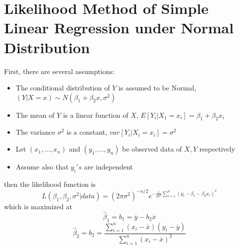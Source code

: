 \documentclass{article}
\begin{document}
\section{Likelihood Method of Simple Linear Regression under Normal Distribution}
First, there are several assumptions:
\begin{itemize}
    \item The conditional distribution of $Y$ is assumed to be Normal, $(Y|X=x)\sim N(\beta_1 + \beta_2x, \sigma^2)$
    \item The mean of $Y$ is a linear function of $X$, $E[Y_i|X_1=x_i] = \beta_1 + \beta_2 x_i$
    \item The variance $\sigma^2$ is a constant, $var[Y_i|X_i=x_i] = \sigma^2$
    \item Let $(x_1,...,x_n)$ and $(y_1,...,y_n)$ be observed data of $X,Y$ respectively
    \item Assume also that $y_i's$ are independent
\end{itemize}
then the likelihood function is
\begin{equation*}
    L(\beta_1,\beta_2,\sigma^2|data) = (2\pi \sigma^2)^{-n/2} e^{-\frac{1}{2\sigma^2}\sum_{i=1}^n(y_i - \beta_1 - \beta_2x_i)^2}
\end{equation*}
which is maximized at
\begin{equation*}
    \hat{\beta}_1 = b_1 = \overline{y} - b_2\overline{x}
\end{equation*}
\begin{equation*}
    \hat{\beta}_2 = b_2 = \frac{\sum_{i=1}^n(x_i - \overline{x})(y_i-\overline{y})}{\sum_{i=1}^n\left(x_i-\overline{x}\right)^2}
\end{equation*}
\end{document}

